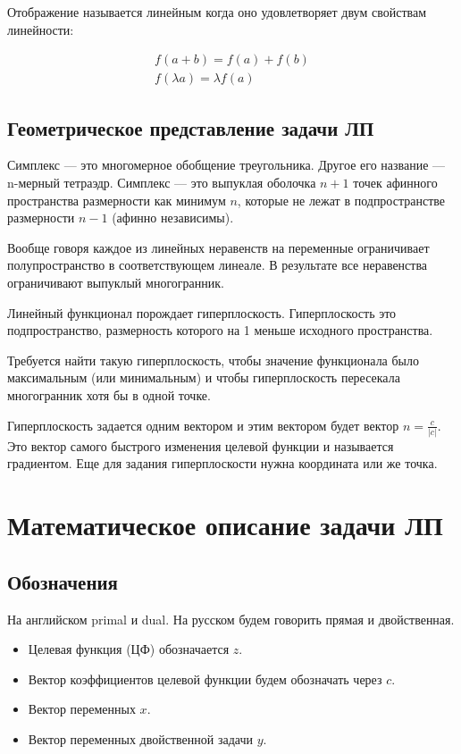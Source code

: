 \documentclass[a4paper,article,14pt]{extarticle}
\begin{document}
Отображение называется линейным когда оно удовлетворяет двум свойствам линейности:

\begin{gather}
    f(a + b) = f(a) + f(b) \\
    f(\lambda a) = \lambda f(a)
\end{gather}

\subsection{Геометрическое представление задачи ЛП}

Симплекс --- это многомерное обобщение треугольника.
Другое его название --- n-мерный тетраэдр.
Симплекс --- это выпуклая оболочка \(n+1\) точек афинного пространства размерности как минимум \(n\), которые не лежат в подпространстве размерности \(n-1\) (афинно независимы).

Вообще говоря каждое из линейных неравенств на переменные ограничивает полупространство в соответствующем линеале.
В результате все неравенства ограничивают выпуклый многогранник.

Линейный функционал порождает гиперплоскость.
Гиперплоскость это подпространство, размерность которого на 1 меньше исходного пространства.

Требуется найти такую гиперплоскость, чтобы значение функционала было максимальным (или минимальным) и чтобы гиперплоскость пересекала многогранник хотя бы в одной точке.

Гиперплоскость задается одним вектором и этим вектором будет вектор \(n = \frac c {|c|}\). Это вектор самого быстрого изменения целевой функции и называется градиентом.
Еще для задания гиперплоскости нужна координата или же точка.

\section{Математическое описание задачи ЛП}

\subsection{Обозначения}

На английском primal и dual.
На русском будем говорить прямая и двойственная.

\begin{itemize}
    \item Целевая функция (ЦФ) обозначается \(z\).
    \item Вектор коэффициентов целевой функции будем обозначать через \(c\).
    \item Вектор переменных \(x\).
    \item Вектор переменных двойственной задачи \(y\).
\end{itemize}
\end{document}

